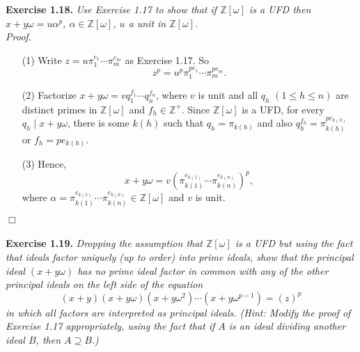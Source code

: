 \documentclass{article}
\begin{document}



\textbf{Exercise 1.18.}
\emph{Use Exercise 1.17 to show that if $\mathbb{Z}[\omega]$ is a UFD then
$x+y\omega = u\alpha^p$, $\alpha \in \mathbb{Z}[\omega]$,
$u$ a unit in $\mathbb{Z}[\omega]$. } \\

\emph{Proof.}
\begin{enumerate}
\item[(1)]
Write $z = u {\pi}_1^{e_1} \cdots {\pi}_m^{e_m}$ as Exercise 1.17.
So
$$z^p = u^p {\pi}_1^{pe_1} \cdots {\pi}_m^{pe_m}.$$
\item[(2)]
Factorize $x + y\omega = v q_1^{f_1} \cdots q_n^{f_n}$,
where $v$ is unit and all $q_h$ $(1 \leq h \leq n)$ are distinct primes in $\mathbb{Z}[\omega]$
and $f_h \in \mathbb{Z}^+$.
Since $\mathbb{Z}[\omega]$ is a UFD,
for every $q_h \mid x + y\omega$, there is some $k(h)$ such that $q_h = \pi_{k(h)}$
and also $q_h^{f_h} = \pi_{k(h)}^{pe_{k(h)}}$ or $f_h = pe_{k(h)}$.
\item[(3)]
Hence,
$$x + y\omega = v \left( \pi_{k(1)}^{e_{k(1)}} \cdots \pi_{k(n)}^{e_{k(n)}} \right)^p,$$
where $\alpha = \pi_{k(1)}^{e_{k(1)}} \cdots \pi_{k(n)}^{e_{k(n)}} \in \mathbb{Z}[\omega]$
and $v$ is unit.
\end{enumerate}
$\Box$ \\\\






\textbf{Exercise 1.19.}
\emph{Dropping the assumption that $\mathbb{Z}[\omega]$ is a UFD but
using the fact that ideals factor uniquely (up to order) into prime ideals,
show that the principal ideal $(x+y\omega)$ has no prime ideal factor in common with
any of the other principal ideals on the left side of the equation
$$(x+y)(x+y\omega)(x+y\omega^2) \cdots (x+y\omega^{p-1}) = (z)^p$$
in which all factors are interpreted as principal ideals.
(Hint: Modify the proof of Exercise 1.17 appropriately,
using the fact that if $A$ is an ideal dividing another ideal $B$,
then $A \supseteq B$.)} \\
\end{document}

